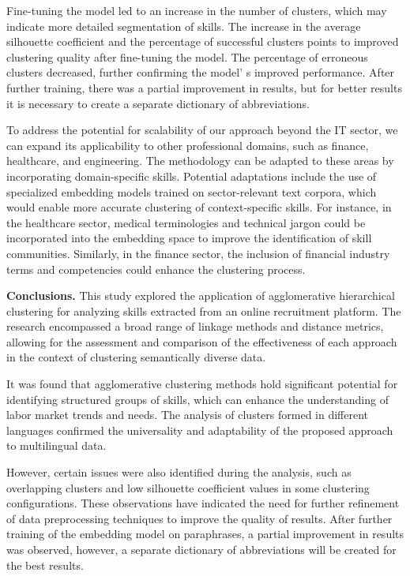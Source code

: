 \begin{multicols}{2}
Fine-tuning the model led to an increase in the number of clusters,
which may indicate more detailed segmentation of skills. The increase in
the average silhouette coefficient and the percentage of successful
clusters points to improved clustering quality after fine-tuning the
model. The percentage of erroneous clusters decreased, further
confirming the model' s improved performance. After
further training, there was a partial improvement in results, but for
better results it is necessary to create a separate dictionary of
abbreviations.

To address the potential for scalability of our approach beyond the IT
sector, we can expand its applicability to other professional domains,
such as finance, healthcare, and engineering. The methodology can be
adapted to these areas by incorporating domain-specific skills.
Potential adaptations include the use of specialized embedding models
trained on sector-relevant text corpora, which would enable more
accurate clustering of context-specific skills. For instance, in the
healthcare sector, medical terminologies and technical jargon could be
incorporated into the embedding space to improve the identification of
skill communities. Similarly, in the finance sector, the inclusion of
financial industry terms and competencies could enhance the clustering
process.

{\bfseries Conclusions.} This study explored the application of
agglomerative hierarchical clustering for analyzing skills extracted
from an online recruitment platform. The research encompassed a broad
range of linkage methods and distance metrics, allowing for the
assessment and comparison of the effectiveness of each approach in the
context of clustering semantically diverse data.

It was found that agglomerative clustering methods hold significant
potential for identifying structured groups of skills, which can enhance
the understanding of labor market trends and needs. The analysis of
clusters formed in different languages confirmed the universality and
adaptability of the proposed approach to multilingual data.

However, certain issues were also identified during the analysis, such
as overlapping clusters and low silhouette coefficient values in some
clustering configurations. These observations have indicated the need
for further refinement of data preprocessing techniques to improve the
quality of results. After further training of the embedding model on
paraphrases, a partial improvement in results was observed, however, a
separate dictionary of abbreviations will be created for the best
results.


\end{multicols}
